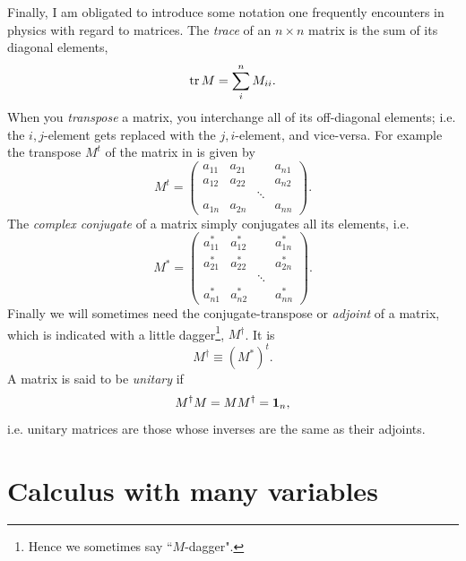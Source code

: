 Finally, I am obligated to introduce some notation one frequently encounters
in physics with regard to matrices. The {\it trace} of an 
$n\times n$ matrix is the sum of its diagonal elements,
\begin{equation}
  \tr M=\sum_i^nM_{ii}.
\end{equation}
When you {\it transpose} a matrix, you interchange all of its
off-diagonal elements; i.e. the $i,j$-element gets replaced with the
$j,i$-element, and vice-versa. For example the transpose $M^t$ of the matrix in
 is given by
\begin{equation}
  M^t=\left(\begin{array}{cccc}
          a_{11}   & a_{21} &       & a_{n1}\\
          a_{12}   & a_{22} &       & a_{n2}\\
                   &        & \ddots&       \\
          a_{1n}   & a_{2n} &       & a_{nn}
            \end{array}\right). 
\end{equation} 
The {\it complex conjugate} 
of a matrix simply conjugates all its elements, i.e.
\begin{equation}
  M^*=\left(\begin{array}{cccc}
          a_{11}^*   & a_{12}^* &       & a_{1n}^*\\
          a_{21}^*   & a_{22}^* &       & a_{2n}^*\\
                     &          & \ddots&         \\
          a_{n1}^*   & a_{n2}^* &       & a_{nn}^*
            \end{array}\right). 
\end{equation}
Finally we will sometimes need the conjugate-transpose or 
{\it adjoint} of a matrix, which is indicated with a 
little dagger\footnote{Hence we sometimes say ``$M$-dagger".},
$M^\dagger$. It is
\begin{equation}
M^\dagger\equiv (M^*)^t.
\end{equation}
A matrix is said to be {\it unitary} if
\begin{equation}
M^\dagger M=MM^\dagger={\mathbf 1}_n,
\end{equation}
i.e. unitary matrices are those whose inverses are the same as 
their adjoints.

\section{Calculus with many variables}


